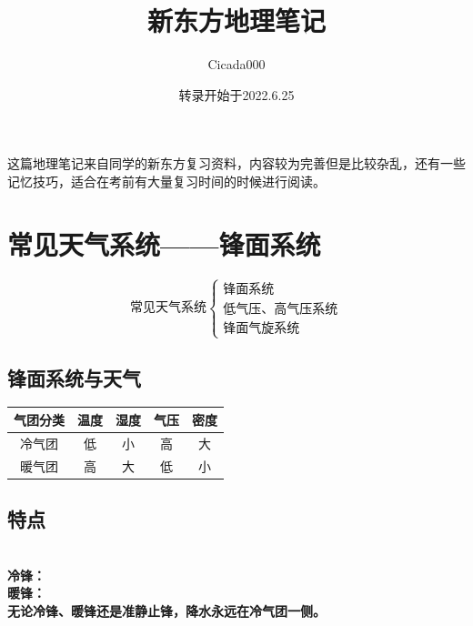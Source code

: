 \documentclass[UTF8]{ctexart}
\title{新东方地理笔记}
\author{Cicada000}
\date{转录开始于2022.6.25}
\begin{document}
    
    \maketitle

    这篇地理笔记来自同学的新东方复习资料，内容较为完善但是比较杂乱，还有一些记忆技巧，适合在考前有大量复习时间的时候进行阅读。

    \thispagestyle{empty}

    \newpage

    \setcounter{page}{1}

    \section*{常见天气系统——锋面系统}

    \[
        \textbf{常见天气系统}
        \begin{cases}
            \text{锋面系统}\\
            \text{低气压、高气压系统}\\
            \text{锋面气旋系统}
        \end{cases}
    \]
    
    \subsection*{锋面系统与天气}

    \begin{table}[h]
        \begin{center}
            \begin{tabular}{ |c|c|c|c|c| }
                \hline 气团分类 & 温度 & 湿度 & 气压 & 密度 \\
                \hline 冷气团 & 低 & 小 & 高 & 大 \\
                \hline 暖气团 & 高 & 大 & 低 & 小 \\
                \hline
            \end{tabular}
        \end{center}
    \end{table}


    \subsection*{特点}
    \\
    \textbf{冷锋：}
    \\
    \textbf{暖锋：}
    \\
    \textbf{无论冷锋、暖锋还是准静止锋，降水永远在冷气团一侧。}
\end{document}
